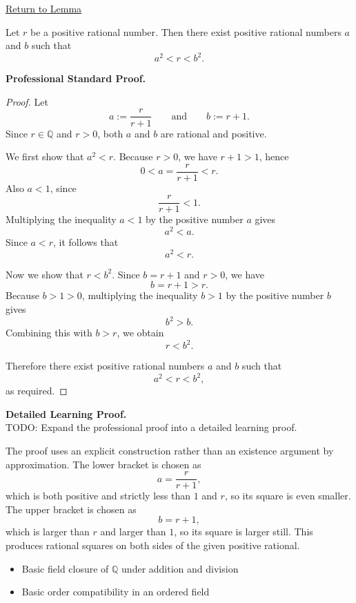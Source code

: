 \newpage
{}
\label{prf:rational-square-bracketing}

\begin{remark*}[Return]
\hyperref[lem:rational-square-bracketing]{Return to Lemma}
\end{remark*}

\begin{lemma*}
Let $r$ be a positive rational number. Then there exist positive rational
numbers $a$ and $b$ such that
\[
a^2<r<b^2.
\]
\end{lemma*}

\textbf{Professional Standard Proof.}~\\
\begin{proof}
Let
\[
a:=\frac{r}{r+1}
\qquad\text{and}\qquad
b:=r+1.
\]
Since $r\in\mathbb{Q}$ and $r>0$, both $a$ and $b$ are rational and positive.

We first show that $a^2<r$. Because $r>0$, we have $r+1>1$, hence
\[
0<a=\frac{r}{r+1}<r.
\]
Also $a<1$, since
\[
\frac{r}{r+1}<1.
\]
Multiplying the inequality $a<1$ by the positive number $a$ gives
\[
a^2<a.
\]
Since $a<r$, it follows that
\[
a^2<r.
\]

Now we show that $r<b^2$. Since $b=r+1$ and $r>0$, we have
\[
b=r+1>r.
\]
Because $b>1>0$, multiplying the inequality $b>1$ by the positive number $b$
gives
\[
b^2>b.
\]
Combining this with $b>r$, we obtain
\[
r<b^2.
\]

Therefore there exist positive rational numbers $a$ and $b$ such that
\[
a^2<r<b^2,
\]
as required.
\end{proof}

\textbf{Detailed Learning Proof.}~\\
TODO: Expand the professional proof into a detailed learning proof.


\begin{remark*}
The proof uses an explicit construction rather than an existence argument by
approximation. The lower bracket is chosen as
\[
a=\frac{r}{r+1},
\]
which is both positive and strictly less than $1$ and $r$, so its square is
even smaller. The upper bracket is chosen as
\[
b=r+1,
\]
which is larger than $r$ and larger than $1$, so its square is larger still.
This produces rational squares on both sides of the given positive rational.
\end{remark*}

\begin{dependencies}
\begin{itemize}
  \item Basic field closure of $\mathbb{Q}$ under addition and division
  \item Basic order compatibility in an ordered field
\end{itemize}
\end{dependencies}
